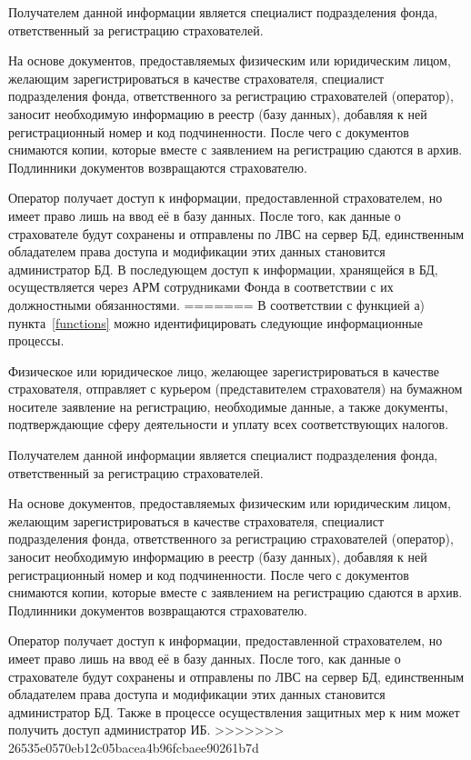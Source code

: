 Получателем данной информации является специалист подразделения фонда,
ответственный за регистрацию страхователей.

\point На основе документов, предоставляемых физическим или
юридическим лицом, желающим зарегистрироваться в качестве
страхователя, специалист подразделения фонда, ответственного за
регистрацию страхователей (оператор), заносит необходимую информацию в
реестр (базу данных), добавляя к ней регистрационный номер и код
подчиненности. После чего с документов снимаются копии, которые вместе
с заявлением на регистрацию сдаются в архив. Подлинники документов
возвращаются страхователю.

\point Оператор получает доступ к информации, предоставленной
страхователем, но имеет право лишь на ввод её в базу данных. После
того, как данные о страхователе будут сохранены и отправлены по ЛВС на
сервер БД, единственным обладателем права доступа и модификации этих
данных становится администратор БД. В последующем доступ к информации,
хранящейся в БД, осуществляется через АРМ сотрудниками Фонда в
соответствии с их должностными обязанностями.
=======
В соответствии с функцией а) пункта~\ref{functions} можно идентифицировать следующие информационные процессы.

\point Физическое или юридическое лицо, желающее зарегистрироваться в качестве страхователя, отправляет с курьером (представителем страхователя) на бумажном носителе заявление на регистрацию, необходимые данные, а также документы, подтверждающие сферу деятельности и уплату всех соответствующих налогов.

Получателем данной информации является специалист подразделения фонда, ответственный за регистрацию страхователей.

\point На основе документов, предоставляемых физическим или юридическим лицом, желающим зарегистрироваться в качестве страхователя, специалист подразделения фонда, ответственного за регистрацию страхователей (оператор), заносит необходимую информацию в реестр (базу данных), добавляя к ней регистрационный номер и код подчиненности. После чего с документов снимаются копии, которые вместе с заявлением на регистрацию сдаются в архив. Подлинники документов возвращаются страхователю.

\point Оператор получает доступ к информации, предоставленной страхователем, но имеет право лишь на ввод её в базу данных. После того, как данные о страхователе будут сохранены и отправлены по ЛВС на сервер БД, единственным обладателем права доступа и модификации этих данных становится администратор БД. Также в процессе осуществления защитных мер к ним может получить доступ администратор ИБ.
>>>>>>> 26535e0570eb12c05bacea4b96fcbaee90261b7d

